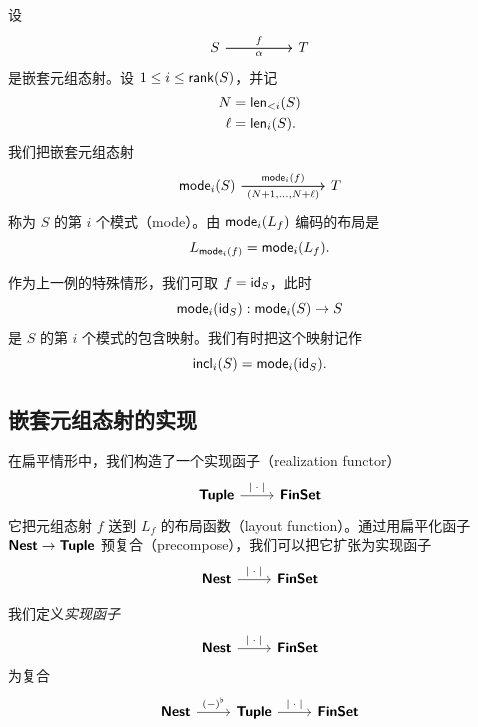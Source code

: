 \begin{example}[模式]\label{definitionofmodesofnestedtuplemorphisms}
    设
        \[ \begin{tikzcd}
S \ar[rr,"f"] \ar[rr,swap,"\alpha"] & & T
    \end{tikzcd}\]
    是嵌套元组态射。设 $1 \leq i \leq \mathsf{rank}(S)$，并记
    \begin{align*}
    N & = \mathsf{len}_{<i}(S)\\
    \ell & = \mathsf{len}_i(S).
    \end{align*}
    我们把嵌套元组态射
    \[ \begin{tikzcd} [column sep = 30]
    \mode_i(S) \ar[rr,"\mode_i(f)"] \ar[rr,swap,"(N+1{,}\dots{,}N+\ell)"]& & T
    \end{tikzcd} \]
    称为 $S$ 的第 $i$ 个模式（mode）。由 $\mathsf{mode}_i(L_f)$ 编码的布局是
    \[
    L_{\mathsf{mode}_i(f)} = \mathsf{mode}_i(L_f).
    \]
\end{example}

\begin{example}[模式包含]\label{definitionofmodeinclusions} 作为上一例的特殊情形，我们可取 $f = \mathsf{id}_S$，此时
\[
\mathsf{mode}_i(\mathsf{id}_S) :\mathsf{mode}_i(S) \to S
\]
是 $S$ 的第 $i$ 个模式的包含映射。我们有时把这个映射记作
\[
\mathsf{incl}_i(S) = \mathsf{mode}_i(\mathsf{id}_S).
\]
\end{example}


\subsection{嵌套元组态射的实现}\label{realizationofnestedtuplemorphisms}

在扁平情形中，我们构造了一个实现函子（realization functor）
\[\begin{tikzcd}
\catstyle{Tuple} \ar[r,"{|} \; \cdot \; {|}"] & \catstyle{FinSet}
\end{tikzcd} \]
它把元组态射 $f$ 送到 $L_f$ 的布局函数（layout function）。通过用扁平化函子 ${\boldsymbol{\mathsf{Nest}}} \to {\boldsymbol{\mathsf{Tuple}}}$ 预复合（precompose），我们可以把它扩张为实现函子
\[ \begin{tikzcd}
\catstyle{Nest} \ar[r,"{|}\; \cdot \;{|}"] & \catstyle{FinSet}
\end{tikzcd} \]

\begin{definition}
    我们定义{\it 实现函子}
    \[\begin{tikzcd}
        \catstyle{Nest}\ar[r,"{|}\;\cdot \;{|}"] & \catstyle{FinSet}
    \end{tikzcd}
    \]
    为复合
    \[\begin{tikzcd}
\catstyle{Nest}\ar[r,"(-)^\flat"] & \catstyle{Tuple} \ar[r,"{|}\; \cdot \; {|}"] & \catstyle{FinSet}
    \end{tikzcd}
    \]
\end{definition}


